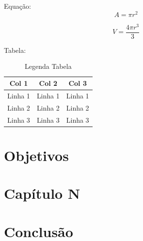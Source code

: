 \documentclass[
	12pt,				%
	openright,			%
	twoside,			%
	a4paper,			%
	english,			%
	spanish,			%
	brazil				%
	]{ufscar}
\begin{document}
Equação:
\begin{equation}
	\label{eq:equacao1}
	  A = {\pi}r^2
\end{equation}

\begin{equation}
	\label{eq:equacao1}
	  V = \frac{4{\pi}r^3}{3}
\end{equation}

Tabela:
\begin{table}[htp]
    \centering
    \caption{Legenda Tabela}
    \begin{tabular}{c|c|c}
         \textbf{Col 1} & \textbf{Col 2} & \textbf{Col 3}  \\
         \hline
         Linha 1 & Linha 1 & Linha 1  \\ 
         Linha 2 & Linha 2 & Linha 2  \\ 
         Linha 3 & Linha 3 & Linha 3  \\ 
         \hline
    \end{tabular}
    
    \label{tab:tabela1}
\end{table}



\chapter{Objetivos}

\chapter{Capítulo N}

\chapter{Conclusão}



\end{document}
